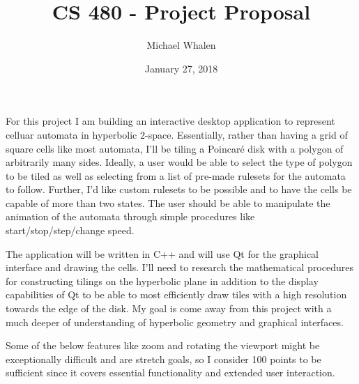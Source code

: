 \documentclass[letterpaper,12pt]{article}
\begin{document}
\title{CS 480 - Project Proposal}
\author{Michael Whalen}
\date{January 27, 2018}
\maketitle

For this project I am building an interactive desktop application to represent celluar automata in hyperbolic 2-space. Essentially, rather than having a grid of square cells like most automata, I'll be tiling a Poincar\'e disk with a polygon of arbitrarily many sides. Ideally, a user would be able to select the type of polygon to be tiled as well as selecting from a list of pre-made rulesets for the automata to follow. Further, I'd like custom rulesets to be possible and to have the cells be capable of more than two states. The user should be able to manipulate the animation of the automata through simple procedures like start/stop/step/change speed.

The application will be written in C++ and will use Qt for the graphical interface and drawing the cells. I'll need to research the mathematical procedures for constructing tilings on the hyperbolic plane in addition to the display capabilities of Qt to be able to most efficiently draw tiles with a high resolution towards the edge of the disk. My goal is come away from this project with a much deeper of understanding of hyperbolic geometry and graphical interfaces.

Some of the below features like zoom and rotating the viewport might be exceptionally difficult and are stretch goals, so I consider 100 points to be sufficient since it covers essential functionality and extended user interaction. 
\end{document}
